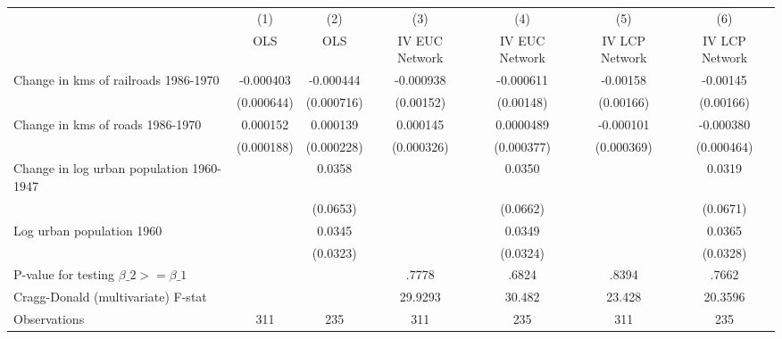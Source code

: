 {
\def\sym#1{\ifmmode^{#1}\else\(^{#1}\)\fi}
\begin{tabular}{l*{6}{c}}
\hline\hline
                &\multicolumn{1}{c}{(1)}&\multicolumn{1}{c}{(2)}&\multicolumn{1}{c}{(3)}&\multicolumn{1}{c}{(4)}&\multicolumn{1}{c}{(5)}&\multicolumn{1}{c}{(6)}\\
                &\multicolumn{1}{c}{OLS}&\multicolumn{1}{c}{OLS}&\multicolumn{1}{c}{IV EUC Network}&\multicolumn{1}{c}{IV EUC Network}&\multicolumn{1}{c}{IV LCP Network}&\multicolumn{1}{c}{IV LCP Network}\\
\hline
Change in kms of railroads 1986-1970&-0.000403         &-0.000444         &-0.000938         &-0.000611         & -0.00158         & -0.00145         \\
                &(0.000644)         &(0.000716)         &(0.00152)         &(0.00148)         &(0.00166)         &(0.00166)         \\
[1em]
Change in kms of roads 1986-1970& 0.000152         & 0.000139         & 0.000145         &0.0000489         &-0.000101         &-0.000380         \\
                &(0.000188)         &(0.000228)         &(0.000326)         &(0.000377)         &(0.000369)         &(0.000464)         \\
[1em]
Change in log urban population 1960-1947&                  &   0.0358         &                  &   0.0350         &                  &   0.0319         \\
                &                  & (0.0653)         &                  & (0.0662)         &                  & (0.0671)         \\
[1em]
Log urban population 1960&                  &   0.0345         &                  &   0.0349         &                  &   0.0365         \\
                &                  & (0.0323)         &                  & (0.0324)         &                  & (0.0328)         \\
\hline
P-value for testing $\beta\_{2} >= \beta\_{1}$&                  &                  &    .7778         &    .6824         &    .8394         &    .7662         \\
Cragg-Donald (multivariate) F-stat&                  &                  &  29.9293         &   30.482         &   23.428         &  20.3596         \\
Observations    &      311         &      235         &      311         &      235         &      311         &      235         \\
\hline\hline
\end{tabular}
}
